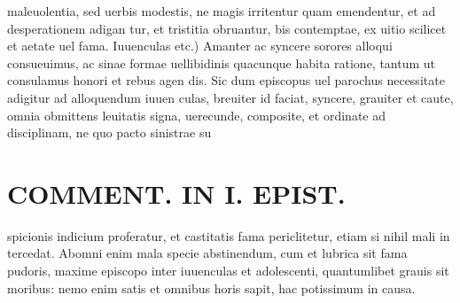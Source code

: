 \documentclass{article}
\begin{document}
\begin{pages}
maleuolentia, sed uerbis modestis, ne magis irritentur quam emendentur, et ad desperationem adigan tur, et tristitia obruantur, bis contemptae, ex uitio scilicet et aetate uel fama. Iuuenculas etc.) Amanter ac syncere sorores alloqui consueuimus, ac sinae formae uellibidinis quacunque habita ratione, tantum ut consulamus honori et rebus agen dis. Sic dum episcopus uel parochus necessitate adigitur ad alloquendum iuuen culas, breuiter id faciat, syncere, grauiter et caute, omnia obmittens leuitatis signa, uerecunde, composite, et ordinate ad disciplinam, ne quo pacto sinistrae su\pend
\section*{COMMENT. IN I. EPIST. }
\marginpar{[ p.514 ]}\pstart spicionis indicium proferatur, et castitatis fama periclitetur, etiam si nihil mali in tercedat. Abomni enim mala specie abstinendum, cum et lubrica sit fama pudoris, maxime episcopo inter iuuenculas et adolescenti, quantumlibet grauis sit moribus: nemo enim satis et omnibus horis sapit, hac potissimum in causa.  \pend
{}
{}

\end{pages}
\end{document}
